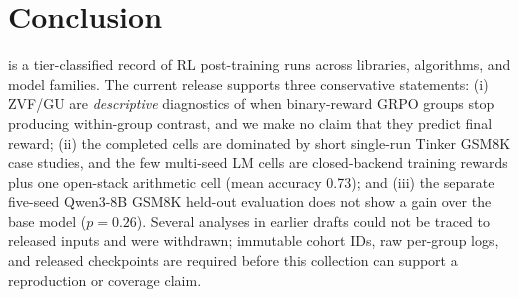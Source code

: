 \section{Conclusion}
\label{sec:conclusion}

\ours{} is a tier-classified record of RL post-training runs across
libraries, algorithms, and model families. The current release supports
three conservative statements: (i) ZVF/GU are \emph{descriptive}
diagnostics of when binary-reward GRPO groups stop producing within-group
contrast, and we make no claim that they predict final reward; (ii) the
completed cells are dominated by short single-run Tinker GSM8K case
studies, and the few multi-seed LM cells are closed-backend training
rewards plus one open-stack arithmetic cell (mean accuracy 0.73); and (iii)
the separate five-seed Qwen3-8B GSM8K held-out evaluation does not show a
gain over the base model ($p{=}0.26$). Several analyses in earlier drafts
could not be traced to released inputs and were withdrawn; immutable cohort
IDs, raw per-group logs, and released checkpoints are required before this
collection can support a reproduction or coverage claim.
